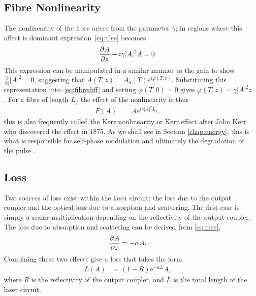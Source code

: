 \subsection{Fibre Nonlinearity}
The nonlinearity of the fibre arises from the parameter $\gamma$; in regions where this affect is dominant expression~\eqref{eq:nlse} becomes
\begin{align}
\label{eq:fibrediff}
	\frac{\partial^{}A}{\partial{z}^{}} - i \gamma |A|^2 A = 0.
\end{align}
This expression can be manipulated in a similar manner to the gain to show $\frac{\partial}{\partial z} |A|^2 = 0$, suggesting that $A(T,z) = A_0(T) e^{i \varphi(T,z)}$. Substituting this representation into~\eqref{eq:fibrediff} and setting $\varphi(T,0)=0$ gives $\varphi(T,z) = \gamma |A|^2 z$. For a fibre of length $L_f$ the effect of the nonlinearity is thus
\begin{align*}
F(A) &= A \textrm{e}^{i \gamma |A|^2 L_f},
\end{align*}
this is also frequently called the Kerr nonlinearity or Kerr effect after John Kerr who discovered the effect in 1875. As we shall see in Section \ref{chap:energy}, this is what is responsible for self-phase modulation and ultimately the degradation of the pulse \cite{desurvire, dunlop, martinez1984, tamura}.

\subsection{Loss}
Two sources of loss exist within the laser circuit: the loss due to the output coupler and the optical loss due to absorption and scattering. The first case is simply a scalar multiplication depending on the reflectivity of the output coupler. The loss due to absorption and scattering can be derived from \eqref{eq:nlse},
\begin{align*}
\frac{\partial^{}A}{\partial{z}^{}} = - \alpha A.
\end{align*}
Combining these two effects give a loss that takes the form
\begin{align*}
L(A) &= (1 - R) \textrm{e}^{- \alpha L}A,
\end{align*}
where $R$ is the reflectivity of the output coupler, and $L$ is the total length of the laser circuit.

